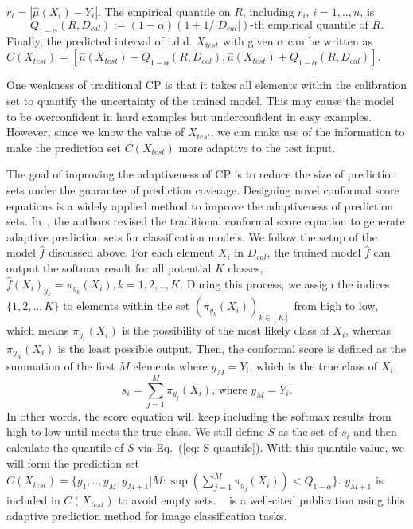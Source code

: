 $r_i = |\hat{\mu}(X_i)-Y_i|$.  The empirical quantile on $R$, including $r_i$, $i=1,..,n$, is
 \begin{equation}\label{eq: R quantile}
Q_{1-\alpha}(R,D_{cal}):=(1-\alpha)(1+1/|D_{cal}|)\text{-th empirical quantile of }R.
 \end{equation} 
Finally, the predicted interval of i.d.d. $X_{test}$ with given $\alpha$ can be written as $C(X_{test})=[\hat{\mu}(X_{test})-Q_{1-\alpha}(R,D_{cal}),\hat{\mu}(X_{test})+Q_{1-\alpha}(R,D_{cal})]$.

One weakness of traditional CP is that it takes all elements within the calibration set to quantify the uncertainty of the trained model. This may cause the model to be overconfident in hard examples but underconfident in easy examples.  However, since we know the value of $X_{test}$, we can make use of the information to make the prediction set $C(X_{test})$ more adaptive to the test input. 

The goal of improving the adaptiveness of CP is to reduce the size of prediction sets under the guarantee of prediction coverage. Designing novel conformal score equations is a widely applied method to improve the adaptiveness of prediction sets. In~\cite{romano2020classification}, the authors revised the traditional conformal score equation to generate adaptive prediction sets for classification models.  We follow the setup of the model $\hat{f}$ discussed above. For each element $X_i$ in $D_{cal}$, the trained model $\hat{f}$ can output the softmax result for all potential $K$ classes, $\hat{f}(X_i)_{y_k}=\pi_{y_k}(X_i), k=1,2,..,K$.  During this process, we assign the indices $\{1,2,.., K\}$ to elements within the set $(\pi_{y_k}(X_i))_{k\in[K]}$ from high to low, which means $\pi_{y_1}(X_i)$ is the possibility of the most likely class of $X_i$, whereas $\pi_{y_K}(X_i)$ is the least possible output.  Then, the conformal score is defined as the summation of the first $M$ elements where $y_M=Y_i$, which is the true class of $X_i$. 
\begin{equation}
s_i = \sum_{j=1}^M \pi_{y_j}(X_i)\text{, where } y_M=Y_i.
\end{equation}
In other words, the score equation will keep including the softmax results from high to low until meets the true class. We still define $S$ as the set of $s_i$ and then calculate the quantile of $S$ via Eq.~(\ref{eq: S quantile}). With this quantile value, we will form the prediction set $C(X_{test})=\{y_1,..,y_M,y_{M+1}|M:\sup(\sum_{j=1}^M \pi_{y_j}(X_i))<Q_{1-\alpha}\}$. $y_{M+1}$ is included in  $C(X_{test})$ to avoid empty sets. ~\cite{angelopoulos2020uncertainty} is a well-cited publication using this adaptive prediction method for image classification tasks.

